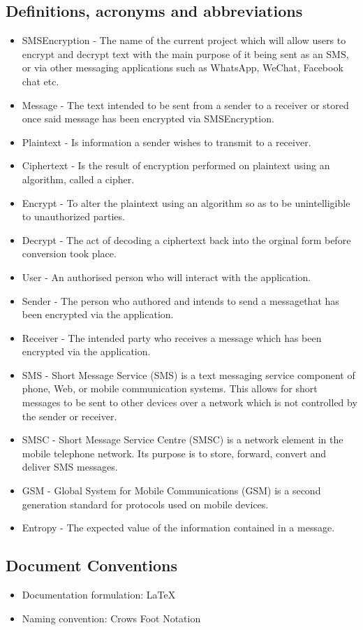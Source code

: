\subsection{Definitions, acronyms and abbreviations}
\begin{itemize}
\item SMSEncryption - The name of the current project which will allow users to encrypt and decrypt text with the main purpose of it being sent as an SMS, or via other messaging applications such as WhatsApp, WeChat, Facebook chat etc.
\item Message - The text intended to be sent from a sender to a receiver  or stored once said message has been encrypted via SMSEncryption.
\item Plaintext -  Is information a sender wishes to transmit to a receiver. 
\item Ciphertext - Is the result of encryption performed on plaintext using an algorithm, called a cipher.
\item Encrypt -  To alter the plaintext using an algorithm so as to be unintelligible to unauthorized parties.
\item Decrypt - The act of decoding a ciphertext back into the orginal form before conversion took place.
\item User - An authorised person who will interact with the application.
\item Sender - The person who authored and intends to send a messagethat has been encrypted via the application.
\item Receiver - The intended party who receives a message which has been encrypted via the application.
\item SMS - Short Message Service (SMS) is a text messaging service component of phone, Web, or mobile communication systems. This allows for short messages to be sent to other devices over a network which is not controlled by the sender or receiver.
\item SMSC - Short Message Service Centre (SMSC) is a network element in the mobile telephone network. Its purpose is to store, forward, convert and deliver SMS messages.
\item GSM - Global System for Mobile Communications (GSM) is a second generation standard for protocols used on mobile devices.
\item Entropy -  The expected value of the information contained in a message.
\end{itemize}

\subsection{Document Conventions}
\begin{itemize}
\item Documentation formulation: LaTeX
\item Naming convention: Crows Foot Notation
\end{itemize}

